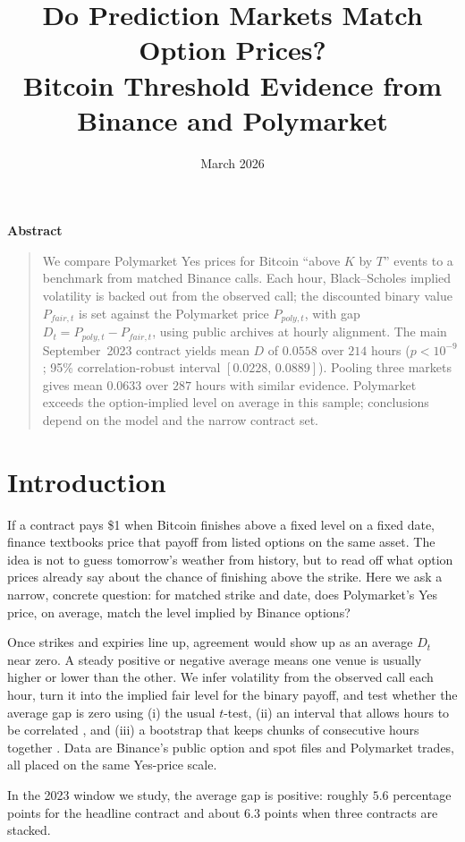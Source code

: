 \documentclass[11pt]{article}
\title{Do Prediction Markets Match Option Prices?\\ Bitcoin Threshold Evidence from Binance and Polymarket}
\author{}
\date{March 2026}
\makeatletter
\numberwithin{equation}{section}
\theoremstyle{plain}
\renewcommand{\maketitle}{%
  \begin{center}
    {\LARGE \bfseries \@title \par}
    \vspace{1em}
    {\normalsize \@date \par}
  \end{center}
  \vspace{1em}
}
\renewenvironment{abstract}
  {\begin{center}\bfseries Abstract\end{center}\begin{quote}\small}
  {\end{quote}\vspace{1em}}
\makeatother
\begin{document}
\maketitle

\begin{abstract}
We compare Polymarket Yes prices for Bitcoin ``above $K$ by $T$'' events to a benchmark from matched Binance calls. Each hour, Black--Scholes implied volatility is backed out from the observed call; the discounted binary value $P_{fair,t}$ is set against the Polymarket price $P_{poly,t}$, with gap $D_t=P_{poly,t}-P_{fair,t}$, using public archives at hourly alignment. The main September~2023 contract yields mean $D$ of $0.0558$ over $214$ hours ($p<10^{-9}$; 95\% correlation-robust interval $[0.0228,\,0.0889]$). Pooling three markets gives mean $0.0633$ over $287$ hours with similar evidence. Polymarket exceeds the option-implied level on average in this sample; conclusions depend on the model and the narrow contract set.
\end{abstract}

\section{Introduction}
If a contract pays \$1 when Bitcoin finishes above a fixed level on a fixed date, finance textbooks price that payoff from listed options on the same asset. The idea is not to guess tomorrow's weather from history, but to read off what option prices already say about the chance of finishing above the strike. Here we ask a narrow, concrete question: for matched strike and date, does Polymarket's Yes price, on average, match the level implied by Binance options?

Once strikes and expiries line up, agreement would show up as an average $D_t$ near zero. A steady positive or negative average means one venue is usually higher or lower than the other. We infer volatility from the observed call each hour, turn it into the implied fair level for the binary payoff, and test whether the average gap is zero using (i) the usual $t$-test, (ii) an interval that allows hours to be correlated \citep{newey1987}, and (iii) a bootstrap that keeps chunks of consecutive hours together \citep{casella2002}. Data are Binance's public option and spot files and Polymarket trades, all placed on the same Yes-price scale.

In the 2023 window we study, the average gap is positive: roughly $5.6$ percentage points for the headline contract and about $6.3$ points when three contracts are stacked.
\end{document}
